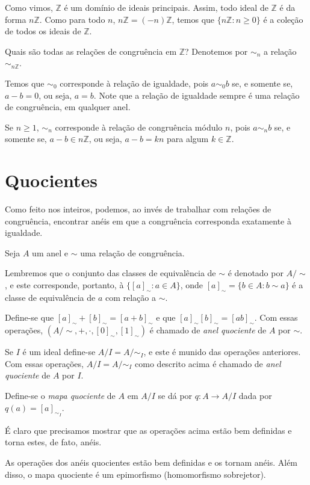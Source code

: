\begin{exemplo}
Como vimos, $\mathbb Z$ é um domínio de ideais principais. Assim, todo ideal de $\mathbb Z$ é da forma $n\mathbb Z$. Como para todo $n$, $n\mathbb Z=(-n)\mathbb Z$, temos que $\{n\mathbb Z: n\geq 0\}$ é a coleção de todos os ideais de $\mathbb Z$.

Quais são todas as relações de congruência em $\mathbb Z$?
Denotemos por $\sim_n$ a relação $\sim_{n\mathbb Z}$.

Temos que $\sim_0$ corresponde à relação de igualdade, pois $a\sim_0 b$ se, e somente se, $a-b=0$, ou seja, $a=b$. Note que a relação de igualdade sempre é uma relação de congruência, em qualquer anel.

Se $n\geq 1$, $\sim_n$ corresponde à relação de congruência módulo $n$, pois $a\sim_n b$ se, e somente se, $a-b\in n\mathbb Z$, ou seja, $a-b=kn$ para algum $k\in \mathbb Z$.
\end{exemplo}

\section{Quocientes}

Como feito nos inteiros, podemos, ao invés de trabalhar com relações de congruência, encontrar anéis em que a congruência corresponda exatamente à igualdade.

\begin{definition}
Seja $A$ um anel e $\sim$ uma relação de congruência.

Lembremos que o conjunto das classes de equivalência de $\sim$ é denotado por $A/\sim$, e este corresponde, portanto, à $\{[a]_\sim: a \in A\}$, onde $[a]_\sim=\{b\in A: b\sim a\}$ é a classe de equivalência de $a$ com relação a $\sim$.

Define-se que $[a]_\sim+[b]_\sim=[a+b]_\sim$ e que $[a]_\sim[b]_\sim=[ab]_\sim$. Com essas operações, $(A/\sim, +, \cdot, [0]_\sim, [1]_\sim)$ é chamado de \emph{anel quociente} de $A$ por $\sim$.

Se $I$ é um ideal define-se $A/I=A/\sim_I$, e este é munido das operações anteriores. Com essas operações, $A/I=A/{\sim_I}$ como descrito acima é chamado de \emph{anel quociente} de $A$ por $I$.

Define-se o \emph{mapa quociente} de $A$ em $A/I$ se dá por $q:A\longrightarrow A/I$ dada por $q(a)=[a]_{\sim_I}$.
\end{definition}

É claro que precisamos mostrar que as operações acima estão bem definidas e torna estes, de fato, anéis.
\begin{lemma}
    As operações dos anéis quocientes estão bem definidas e os tornam anéis. Além disso, o mapa quociente é um epimorfismo (homomorfismo sobrejetor).
\end{lemma}

